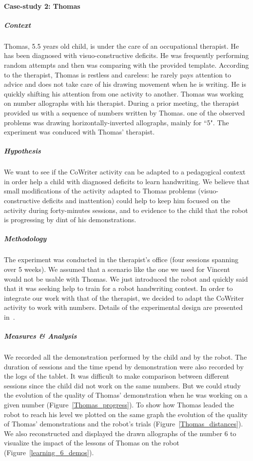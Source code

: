 \documentclass[10pt,a4paper]{article}
\begin{document}
\paragraph{Case-study 2: Thomas}
\subparagraph{Context}
Thomas, 5.5 years old child, is under the care of an occupational
therapist. He has been diagnosed with visuo-constructive deficits.
He was frequently performing random attempts and then was comparing
with the provided template. According to the therapist, Thomas is restless and careless: he
rarely pays attention to
advice and does not take care of his drawing movement when he is writing. He is
quickly shifting his attention from one activity to another. Thomas was working on number allographs with his therapist. During a prior
meeting, the therapist provided us with a sequence of numbers
written by Thomas. one of the observed problems was drawing
horizontally-inverted allographs, mainly for ``5". The experiment was conduced with Thomas' therapist. 
\subparagraph{Hypothesis}
We want to see if the CoWriter activity can be adapted to a pedagogical context in order help a child with diagnosed deficits to learn handwriting. We believe that small modifications of the activity adapted to
Thomas problems (visuo-constructive deficits and inattention) could help to
keep him focused on the activity during forty-minutes sessions, and to evidence to the child that the robot is progressing by dint of his demonstrations. 
\subparagraph{Methodology}
The experiment was conducted in the therapist's office (four sessions 
spanning over 5 weeks). We assumed that a scenario like the one we used 
for Vincent would not be usable with Thomas. We just introduced the robot 
and quickly said that it was seeking help to train for a robot handwriting contest. In order to integrate our work with that of the therapist, we decided to adapt the 
CoWriter activity to work with numbers. Details of the experimental design are presented in~\cite{jacq2016building}.
\subparagraph{Measures \& Analysis}
We recorded all the demonstration performed by the child and by the robot. The duration of sessions and the time spend by demonstration were also recorded by the logs of the tablet. It was difficult to make comparison between different sessions since the child did not work on the same numbers. But we could study the evolution of the quality of Thomas' demonstration when he was working on a given number (Figure~\ref{Thomas_progress}).
To show how Thomas leaded the robot to reach his level we plotted on the same graph the evolution of the quality of Thomas' demonstrations and the robot's trials (Figure~\ref{Thomas_distances}). We also reconstructed and displayed the drawn allographs of the number 6 to visualize the impact of the lessons of Thomas on the robot (Figure~\ref{learning_6_demos}). 
\end{document}
